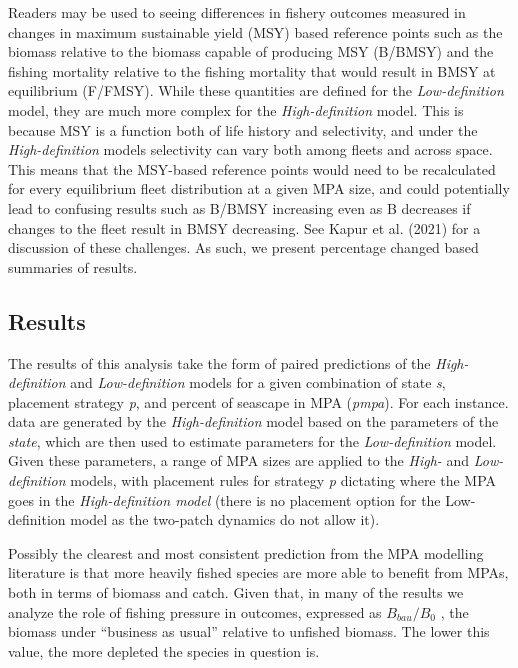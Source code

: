 \documentclass[
  default,
  lineno,
  referee]{sn-jnl}
\begin{document}
Readers may be used to seeing differences in fishery outcomes measured
in changes in maximum sustainable yield (MSY) based reference points
such as the biomass relative to the biomass capable of producing MSY
(B/BMSY) and the fishing mortality relative to the fishing mortality
that would result in BMSY at equilibrium (F/FMSY). While these
quantities are defined for the \emph{Low-definition} model, they are
much more complex for the \emph{High-definition} model. This is because
MSY is a function both of life history and selectivity, and under the
\emph{High-definition} models selectivity can vary both among fleets and
across space. This means that the MSY-based reference points would need
to be recalculated for every equilibrium fleet distribution at a given
MPA size, and could potentially lead to confusing results such as B/BMSY
increasing even as B decreases if changes to the fleet result in BMSY
decreasing. See Kapur et al. (2021) for a discussion of these
challenges. As such, we present percentage changed based summaries of
results.

\subsection{Results}\label{results}

The results of this analysis take the form of paired predictions of the
\emph{High-definition} and \emph{Low-definition} models for a given
combination of state \emph{s}, placement strategy \emph{p}, and percent
of seascape in MPA (\emph{pmpa}). For each instance. data are generated
by the \emph{High-definition} model based on the parameters of the
\emph{state}, which are then used to estimate parameters for the
\emph{Low-definition} model. Given these parameters, a range of MPA
sizes are applied to the \emph{High-} and \emph{Low-definition} models,
with placement rules for strategy \emph{p} dictating where the MPA goes
in the \emph{High-definition model} (there is no placement option for
the Low-definition model as the two-patch dynamics do not allow it).

Possibly the clearest and most consistent prediction from the MPA
modelling literature is that more heavily fished species are more able
to benefit from MPAs, both in terms of biomass and catch. Given that, in
many of the results we analyze the role of fishing pressure in outcomes,
expressed as \(B_{bau}/B_0\) , the biomass under ``business as usual''
relative to unfished biomass. The lower this value, the more depleted
the species in question is.
\end{document}
